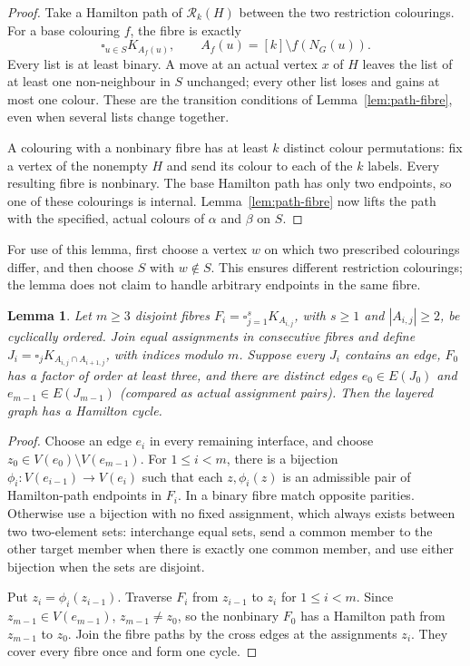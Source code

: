 \documentclass[11pt]{article}
\newtheorem{lemma}[theorem]{Lemma}
\theoremstyle{remark}
\newcommand{\Rk}{\mathcal R_k}
\numberwithin{equation}{section}
\numberwithin{table}{section}
\begin{document}
\begin{proof}
Take a Hamilton path of $\Rk(H)$ between the two restriction
colourings.  For a base colouring $f$, the fibre is exactly
\[
 \square_{u\in S}K_{A_f(u)},\qquad
 A_f(u)=[k]\setminus f(N_G(u)).
\]
Every list is at least binary.  A move at an actual vertex $x$ of $H$
leaves the list of at least one non-neighbour in $S$ unchanged; every
other list loses and gains at most one colour.  These are the transition
conditions of Lemma~\ref{lem:path-fibre}, even when several lists
change together.

A colouring with a nonbinary fibre has at least $k$ distinct colour
permutations: fix a vertex of the nonempty $H$ and send its colour to
each of the $k$ labels.  Every resulting fibre is nonbinary.  The base
Hamilton path has only two endpoints, so one of these colourings is
internal.  Lemma~\ref{lem:path-fibre} now lifts the path with the
specified, actual colours of $\alpha$ and $\beta$ on $S$.
\end{proof}

For use of this lemma, first choose a vertex $w$ on which two prescribed
colourings differ, and then choose $S$ with $w\notin S$.  This ensures
different restriction colourings; the lemma does not claim to handle
arbitrary endpoints in the same fibre.

\begin{lemma}
\label{lem:fibre-lift}
Let $m\ge3$ disjoint fibres
$F_i=\square_{j=1}^sK_{A_{i,j}}$, with $s\ge1$ and
$|A_{i,j}|\ge2$, be cyclically ordered.  Join equal assignments in
consecutive fibres and define
$J_i=\square_j K_{A_{i,j}\cap A_{i+1,j}}$, with indices modulo $m$.
Suppose every $J_i$ contains an edge, $F_0$ has a factor of order at
least three, and there are distinct edges
$e_0\in E(J_0)$ and $e_{m-1}\in E(J_{m-1})$ (compared as actual
assignment pairs).  Then the layered graph has a Hamilton cycle.
\end{lemma}

\begin{proof}
Choose an edge $e_i$ in every remaining interface, and choose
$z_0\in V(e_0)\setminus V(e_{m-1})$.  For $1\le i<m$, there is a
bijection $\phi_i:V(e_{i-1})\to V(e_i)$ such that each
$z,\phi_i(z)$ is an admissible pair of Hamilton-path endpoints in
$F_i$.  In a binary fibre match opposite parities.  Otherwise use a
bijection with no fixed assignment, which always exists between two
two-element sets: interchange equal sets, send a common member to the
other target member when there is exactly one common member, and use
either bijection when the sets are disjoint.

Put $z_i=\phi_i(z_{i-1})$.  Traverse $F_i$ from $z_{i-1}$ to $z_i$
for $1\le i<m$.  Since $z_{m-1}\in V(e_{m-1})$,
$z_{m-1}\ne z_0$, so the nonbinary $F_0$ has a Hamilton path from
$z_{m-1}$ to $z_0$.  Join the fibre paths by the cross edges at the
assignments $z_i$.  They cover every fibre once and form one cycle.
\end{proof}
\end{document}

